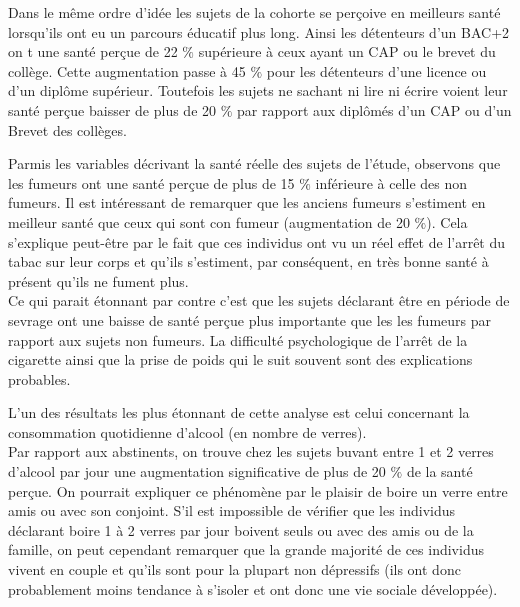 \documentclass{book}
\begin{document}
\noindent
Dans le même ordre d'idée les sujets de la cohorte se perçoive en meilleurs santé lorsqu'ils ont eu un parcours éducatif plus long. Ainsi les détenteurs d'un BAC+2 on t une santé perçue de 22 $\%$ supérieure à ceux ayant un CAP ou le brevet du collège. Cette augmentation passe à 45 $\%$ pour les détenteurs d'une licence ou d'un diplôme supérieur. Toutefois les sujets ne sachant ni lire ni écrire voient leur santé perçue baisser de plus de 20 $\%$ par rapport aux diplômés d'un CAP ou d'un Brevet des collèges.\\
\bigskip


\noindent
Parmis les variables décrivant la santé réelle des sujets de l'étude, observons que les fumeurs ont une santé perçue de plus de 15 $\%$ inférieure à celle des non fumeurs. Il est intéressant de remarquer que les anciens fumeurs s'estiment en meilleur santé que ceux qui sont con fumeur (augmentation de 20 $\%$). Cela s'explique peut-être par le fait que ces individus ont vu un réel effet de l'arrêt du tabac sur leur corps et qu'ils s'estiment, par conséquent, en très bonne santé à présent qu'ils ne fument plus.\\
Ce qui parait étonnant par contre c'est que les sujets déclarant être en période de sevrage ont une baisse de santé perçue plus importante que les les fumeurs par rapport aux sujets non fumeurs. La difficulté psychologique de l'arrêt de la cigarette ainsi que la prise de poids qui le suit souvent sont des explications probables.\\
\bigskip

\noindent
L'un des résultats les plus étonnant de cette analyse est celui concernant la consommation quotidienne d'alcool (en nombre de verres).\\
Par rapport aux abstinents, on trouve chez les sujets buvant entre 1 et 2 verres d'alcool par jour une augmentation significative de plus de 20 $\%$ de la santé perçue. On pourrait expliquer ce phénomène par le plaisir de boire un verre entre amis ou avec son conjoint. S'il est impossible de vérifier que les individus déclarant boire 1 à 2 verres par jour boivent seuls ou avec des amis ou de la famille, on peut cependant remarquer que la grande majorité de ces individus vivent en couple et qu'ils sont pour la plupart non dépressifs (ils ont donc probablement moins tendance à s'isoler et ont donc une vie sociale développée).
\end{document}
